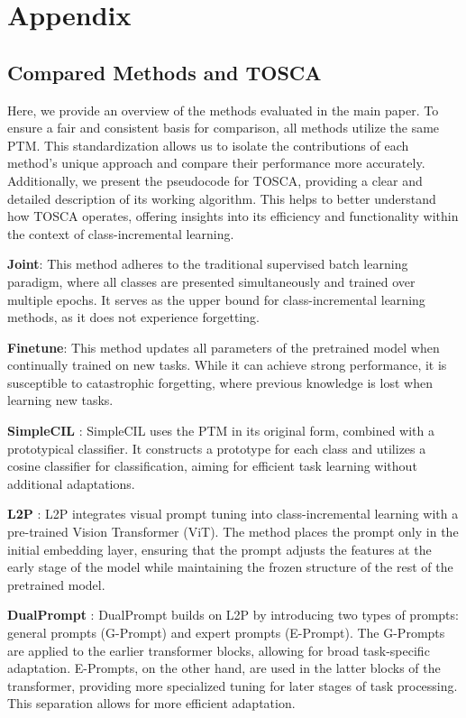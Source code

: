 \clearpage
\appendix
\section{Appendix}

\subsection{Compared Methods and TOSCA}
\label{Compared Methods and TOSCA}
Here, we provide an overview of the methods evaluated in the main paper. To ensure a fair and consistent basis for comparison, all methods utilize the same PTM. This standardization allows us to isolate the contributions of each method’s unique approach and compare their performance more accurately. Additionally, we present the pseudocode for TOSCA, providing a clear and detailed description of its working algorithm. This helps to better understand how TOSCA operates, offering insights into its efficiency and functionality within the context of class-incremental learning.

\textbf{Joint}: This method adheres to the traditional supervised batch learning paradigm, where all classes are presented simultaneously and trained over multiple epochs. It serves as the upper bound for class-incremental learning methods, as it does not experience forgetting.
    
\textbf{Finetune}: This method updates all parameters of the pretrained model when continually trained on new tasks. While it can achieve strong performance, it is susceptible to catastrophic forgetting, where previous knowledge is lost when learning new tasks.
        
\textbf{SimpleCIL} \cite{simplecil_aper}: SimpleCIL uses the PTM in its original form, combined with a prototypical classifier. It constructs a prototype for each class and utilizes a cosine classifier for classification, aiming for efficient task learning without additional adaptations.
    
\textbf{L2P} \cite{l2p}: L2P integrates visual prompt tuning into class-incremental learning with a pre-trained Vision Transformer (ViT). The method places the prompt only in the initial embedding layer, ensuring that the prompt adjusts the features at the early stage of the model while maintaining the frozen structure of the rest of the pretrained model.
    
\textbf{DualPrompt} \cite{dualprompt}: DualPrompt builds on L2P by introducing two types of prompts: general prompts (G-Prompt) and expert prompts (E-Prompt). The G-Prompts are applied to the earlier transformer blocks, allowing for broad task-specific adaptation. E-Prompts, on the other hand, are used in the latter blocks of the transformer, providing more specialized tuning for later stages of task processing. This separation allows for more efficient adaptation.
    
